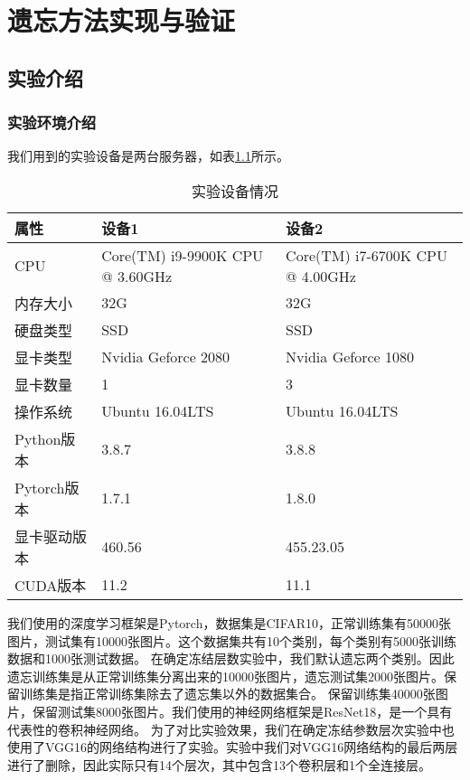 
\chapter{遗忘方法实现与验证}

\section{实验介绍}

\subsection{实验环境介绍}
我们用到的实验设备是两台服务器，如表\ref{tab:experiment-deivce}所示。
\begin{table}
    \centering
    \caption{实验设备情况}
    \begin{tabular}{lll}
      \toprule
      属性  & 设备1 & 设备2  \\
      \midrule
      CPU   & Core(TM) i9-9900K CPU @ 3.60GHz & Core(TM) i7-6700K CPU @ 4.00GHz \\
      内存大小  & 32G & 32G                    \\
      硬盘类型 & SSD  & SSD  \\
      显卡类型 & Nvidia Geforce 2080  & Nvidia Geforce 1080  \\
      显卡数量 & 1  & 3  \\
      操作系统 & Ubuntu 16.04LTS  & Ubuntu 16.04LTS  \\
      Python版本 & 3.8.7  & 3.8.8  \\
      Pytorch版本 & 1.7.1  & 1.8.0  \\
      显卡驱动版本 & 460.56  & 455.23.05  \\
      CUDA版本 & 11.2  & 11.1  \\
      \bottomrule
    \end{tabular}
    \label{tab:experiment-deivce}
\end{table}

我们使用的深度学习框架是Pytorch，数据集是CIFAR10\cite{cifar10_2009}，正常训练集有50000张图片，测试集有10000张图片。这个数据集共有10个类别，每个类别有5000张训练数据和1000张测试数据。
在确定冻结层数实验中，我们默认遗忘两个类别。因此遗忘训练集是从正常训练集分离出来的10000张图片，遗忘测试集2000张图片。保留训练集是指正常训练集除去了遗忘集以外的数据集合。
保留训练集40000张图片，保留测试集8000张图片。我们使用的神经网络框架是ResNet18\cite{He_2016_CVPR}，是一个具有代表性的卷积神经网络。
为了对比实验效果，我们在确定冻结参数层次实验中也使用了VGG16\cite{Simonyan15}的网络结构进行了实验。实验中我们对VGG16网络结构的最后两层进行了删除，因此实际只有14个层次，其中包含13个卷积层和1个全连接层。

